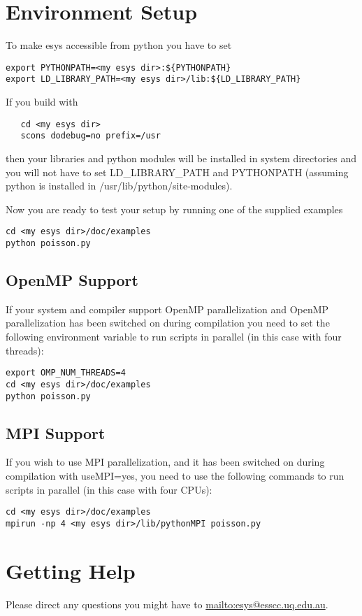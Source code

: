 \section{Environment Setup}
To make esys accessible from python you have to set
\begin{verbatim}
export PYTHONPATH=<my esys dir>:${PYTHONPATH}
export LD_LIBRARY_PATH=<my esys dir>/lib:${LD_LIBRARY_PATH}
\end{verbatim}

If you build \esys with
\begin{verbatim}
   cd <my esys dir>
   scons dodebug=no prefix=/usr
\end{verbatim}
then your libraries and python modules will be installed in system directories and you will
not have to set LD_LIBRARY_PATH and PYTHONPATH (assuming python is installed in
/usr/lib/python/site-modules).

Now you are ready to test your setup by running one of the supplied examples
\begin{verbatim}
cd <my esys dir>/doc/examples
python poisson.py
\end{verbatim}

\subsection{OpenMP Support}

If your system and compiler support OpenMP parallelization and OpenMP parallelization has been switched on during compilation you need to set the following environment variable to run scripts in parallel (in this case with four threads):
\begin{verbatim}
export OMP_NUM_THREADS=4
cd <my esys dir>/doc/examples
python poisson.py
\end{verbatim}

\subsection{MPI Support}

If you wish to use MPI parallelization, and it has been switched on during compilation with useMPI=yes, you need to use the following commands to run scripts in parallel (in this case with four CPUs):
\begin{verbatim}
cd <my esys dir>/doc/examples
mpirun -np 4 <my esys dir>/lib/pythonMPI poisson.py
\end{verbatim}

\section{Getting Help}
Please direct any questions you might have to \url{mailto:esys@esscc.uq.edu.au}.
